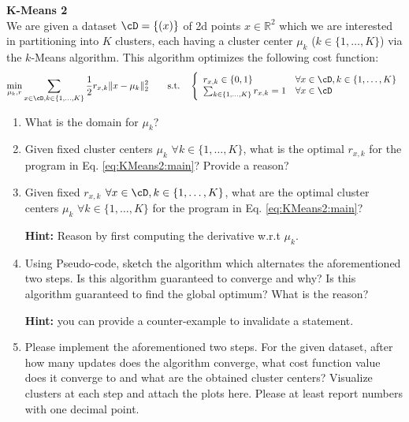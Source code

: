 \begin{Q}
\textbf{\Large K-Means 2}\\

We are given a dataset $\cD = \{(x)\}$ of 2d points $x\in\mathbb{R}^2$ which we are interested in partitioning into $K$ clusters, each having a cluster center $\mu_k$ ($k\in\{1, \ldots, K\}$) via the $k$-Means algorithm. This algorithm optimizes the following cost function:
\begin{equation}
	\min_{\mu_k, r} \sum_{x\in\cD,k\in\{1, \ldots, K\}} \frac{1}{2}r_{x,k}\|x - \mu_k\|_2^2 \quad\quad\text{s.t.}\quad \left\{\begin{array}{ll}
r_{x,k}\in\{0,1\}&\forall x\in\cD,k\in\{1, \ldots, K\}\\
\sum_{k\in\{1, \ldots, K\}} r_{x,k} = 1 & \forall x\in\cD
\end{array}\right.
\label{eq:KMeans2:main}
\end{equation}

\begin{enumerate}

\item What is the domain for $\mu_k$?

\item Given fixed cluster centers $\mu_k$ $\forall k\in\{1, \ldots, K\}$, what is the optimal $r_{x,k}$ for the program in Eq. \ref{eq:KMeans2:main}? Provide a reason?

\item Given fixed $r_{x,k}$ $\forall x\in\cD,k\in\{1, \ldots, K\}$, what are the optimal cluster centers $\mu_k$ $\forall k\in\{1, \ldots, K\}$ for the program in Eq. \ref{eq:KMeans2:main}? 

\textbf{Hint:} Reason by first computing the derivative w.r.t $\mu_k$.

\item Using Pseudo-code, sketch the algorithm which alternates the aforementioned two steps. Is this algorithm guaranteed to converge and why? Is this algorithm guaranteed to find the global optimum? What is the reason?

\textbf{Hint:} you can provide a counter-example to invalidate a statement.

\item Please implement the aforementioned two steps. For the given dataset, after how many updates does the algorithm converge, what cost function value does it converge to and what are the obtained cluster centers? Visualize clusters at each step and attach the plots here. Please at least report numbers with one decimal point.


\end{enumerate}
\end{Q}
